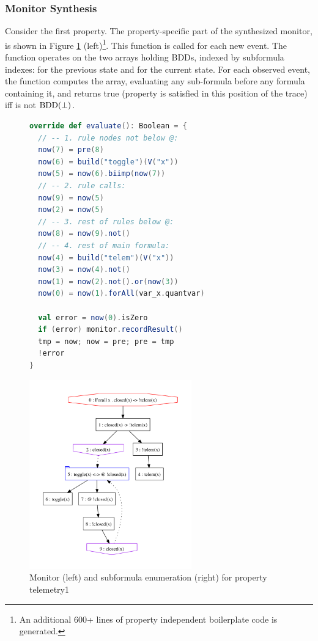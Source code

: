 \subsubsection{Monitor Synthesis}

Consider the first  property. The property-specific 
part of the synthesized monitor, is shown 
in Figure \ref{fig:monitor} (left)\footnote{An additional 600+ lines of property independent 
boilerplate code is generated.}. This function is called for each new event. The function operates on the two arrays holding BDDs, indexed by subformula indexes:  for the previous state and  for the current state. For each observed event, the function  computes the  array, evaluating any sub-formula before any formula containing it,
and returns true (property is satisfied in this position of the trace)  iff  is not $\mathrm{BDD}(\bot)$. 

\begin{figure}[htb]
\centering
\begin{minipage}[b]{.51\textwidth}
\begin{lstlisting}[language=scala,basicstyle=\sffamily]
override def evaluate(): Boolean = {
  // -- 1. rule nodes not below @:
  now(7) = pre(8)
  now(6) = build("toggle")(V("x"))
  now(5) = now(6).biimp(now(7))
  // -- 2. rule calls:
  now(9) = now(5)
  now(2) = now(5)
  // -- 3. rest of rules below @:
  now(8) = now(9).not()
  // -- 4. rest of main formula:
  now(4) = build("telem")(V("x"))
  now(3) = now(4).not()
  now(1) = now(2).not().or(now(3))
  now(0) = now(1).forAll(var_x.quantvar)

  val error = now(0).isZero
  if (error) monitor.recordResult()
  tmp = now; now = pre; pre = tmp
  !error
}
\end{lstlisting}
\end{minipage}
\qquad
\begin{minipage}[b]{.43\textwidth}
\includegraphics[width=7cm]{figures/ast.pdf}
\end{minipage}
\caption{Monitor (left) and subformula enumeration (right) for property telemetry1}
\label{fig:monitor}
\end{figure}

